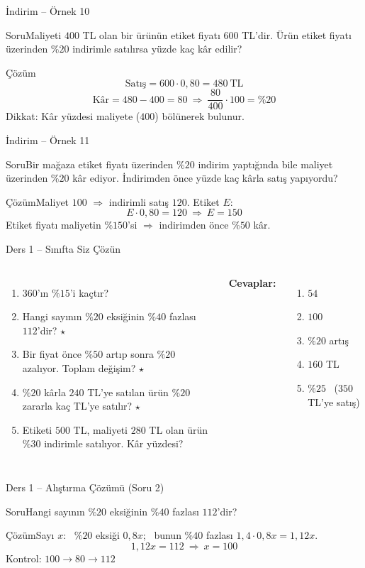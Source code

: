 \documentclass[aspectratio=169,11pt,handout]{beamer}
\newcommand{\soru}[3]{%
\begin{frame}{#1}
  \begin{block}{Soru}\large #2\end{block}
  \pause
  \begin{exampleblock}{Çözüm}\large #3\end{exampleblock}
\end{frame}}
\begin{document}
\soru{İndirim -- Örnek 10}
{Maliyeti \(400\) TL olan bir ürünün etiket fiyatı \(600\) TL'dir. Ürün etiket fiyatı üzerinden \(\%20\) indirimle satılırsa yüzde kaç kâr edilir?}
{\[\text{Satış}=600\cdot 0{,}80=480\ \text{TL}\]
\[\text{Kâr}=480-400=80\ \Rightarrow\ \frac{80}{400}\cdot 100=\%20\]
Dikkat: Kâr yüzdesi maliyete (\(400\)) bölünerek bulunur.}

\soru{İndirim -- Örnek 11}
{Bir mağaza etiket fiyatı üzerinden \(\%20\) indirim yaptığında bile maliyet üzerinden \(\%20\) kâr ediyor. İndirimden önce yüzde kaç kârla satış yapıyordu?}
{Maliyet \(100\) \(\Rightarrow\) indirimli satış \(120\). Etiket \(E\):
\[E\cdot 0{,}80=120\ \Rightarrow\ E=150\]
Etiket fiyatı maliyetin \(\%150\)'si \(\Rightarrow\) indirimden önce \(\%50\) kâr.}

\begin{frame}{Ders 1 -- Sınıfta Siz Çözün}
\begin{columns}[t]
\begin{enumerate}
\item \(360\)'ın \(\%15\)'i kaçtır?
\item Hangi sayının \(\%20\) eksiğinin \(\%40\) fazlası \(112\)'dir? \(\star\)
\item Bir fiyat önce \(\%50\) artıp sonra \(\%20\) azalıyor. Toplam değişim? \(\star\)
\item \(\%20\) kârla \(240\) TL'ye satılan ürün \(\%20\) zararla kaç TL'ye satılır? \(\star\)
\item Etiketi \(500\) TL, maliyeti \(280\) TL olan ürün \(\%30\) indirimle satılıyor. Kâr yüzdesi?
\end{enumerate}
\pause
\textbf{Cevaplar:}
\begin{enumerate}
\item \(54\)
\item \(100\)
\item \(\%20\) artış
\item \(160\) TL
\item \(\%25\) \ (\(350\) TL'ye satış)
\end{enumerate}
\end{columns}
\vspace{4pt}{\footnotesize \(\star\) işaretli soruların adım adım çözümü sonraki slaytlardadır.}
\end{frame}

\soru{Ders 1 -- Alıştırma Çözümü (Soru 2)}
{Hangi sayının \(\%20\) eksiğinin \(\%40\) fazlası \(112\)'dir?}
{Sayı \(x\): \ \(\%20\) eksiği \(0{,}8x\); \ bunun \(\%40\) fazlası \(1{,}4\cdot 0{,}8x=1{,}12x\).
\[1{,}12x=112\ \Rightarrow\ x=100\]
Kontrol: \(100\to 80\to 112\) \checkmark}
\end{document}
